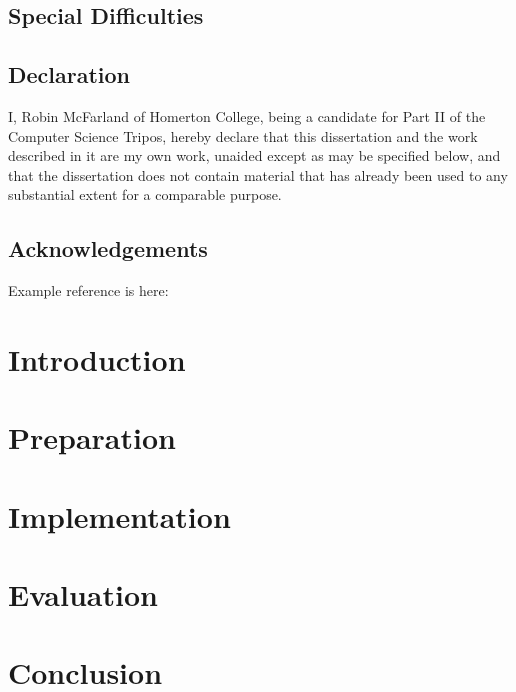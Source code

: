 \documentclass[12pt,a4paper,twoside,openright]{report}
\begin{document}
\section*{Special Difficulties}
 
\newpage
\section*{Declaration}

I, Robin McFarland of Homerton College, being a candidate for Part II of the Computer
Science Tripos, hereby declare
that this dissertation and the work described in it are my own work,
unaided except as may be specified below, and that the dissertation
does not contain material that has already been used to any substantial
extent for a comparable purpose.

\bigskip
{}

\medskip
{}

\tableofcontents

\listoffigures

\newpage
\section*{Acknowledgements}
Example reference is here: \cite{Moore95}


\pagestyle{headings}

\chapter{Introduction}

\chapter{Preparation}

\chapter{Implementation}

\chapter{Evaluation}

\chapter{Conclusion}
\end{document}
